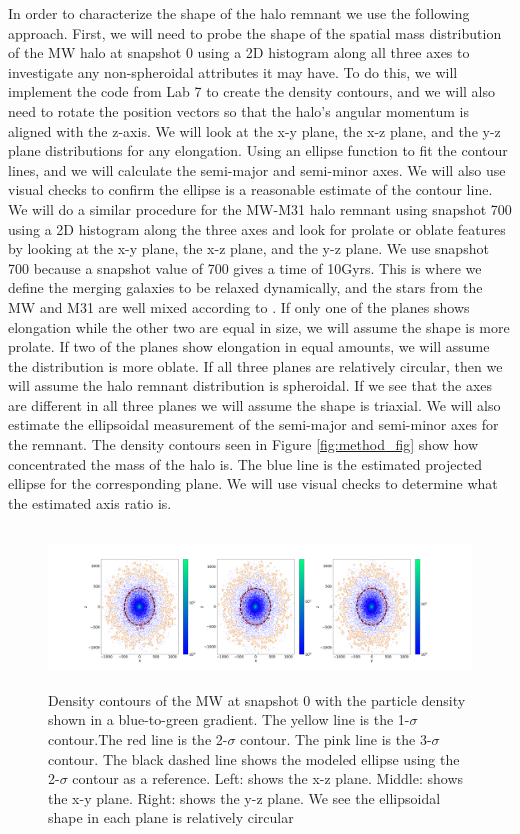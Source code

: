 \documentclass[linenumbers, twocolumn]{aastex631}
\begin{document}
In order to characterize the shape of the halo remnant we use the following approach.
First, we will need to probe the shape of the spatial mass distribution of the MW halo at snapshot 0 using a 2D histogram along all three axes to investigate any non-spheroidal attributes it may have. To do this, we will implement the code from Lab 7 to create the density contours, and we will also need to rotate the position vectors so that the halo's angular momentum is aligned with the z-axis. We will look at the x-y plane, the x-z plane, and the y-z plane distributions for any elongation. Using an ellipse function to fit the contour lines, and we will calculate the semi-major and semi-minor axes. We will also use visual checks to confirm the ellipse is a reasonable  estimate of the contour line.
We will do a similar procedure for the MW-M31 halo remnant using snapshot 700 using a 2D histogram along the three axes and look for prolate or oblate features by looking at the x-y plane, the x-z plane, and the y-z plane. We use snapshot 700 because a snapshot value of 700 gives a time of 10Gyrs. This is where we define the merging galaxies to be relaxed dynamically, and the stars from the MW and M31 are well mixed according to \cite{2012VanDerMarel}. If only one of the planes shows elongation while the other two are equal in size, we will assume the shape is more prolate. If two of the planes show elongation in equal amounts, we will assume the distribution is more oblate. If all three planes are relatively circular, then we will assume the halo remnant distribution is spheroidal. If we see that the axes are different in all three planes we will assume the shape is triaxial. We will also estimate the ellipsoidal measurement of the semi-major and semi-minor axes for the remnant.
The density contours seen in Figure \ref{fig:method_fig} show how concentrated the mass of the halo is. The blue line is the estimated projected ellipse for the corresponding plane. We will use visual checks to determine what the estimated axis ratio is.

\begin{figure}
    \centering
    \includegraphics[width=\textwidth,height=4.2cm]{figures/MW_M31_000_3subplots_Density.png}
    \caption{Density contours of the MW at snapshot 0 with the particle density shown in a blue-to-green gradient. The yellow line is the 1-$\sigma$ contour.The red line is the 2-$\sigma$ contour. The pink line is the 3-$\sigma$ contour. The black dashed line shows the modeled ellipse using the 2-$\sigma$ contour as a reference. Left: shows the x-z plane. Middle: shows the x-y plane. Right: shows the y-z plane. We see the ellipsoidal shape in each plane is relatively circular}
    \label{fig:MW_contour_0}
\end{figure}
\end{document}
